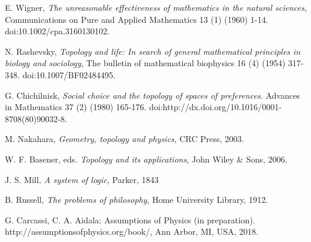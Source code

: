 \documentclass{amsart}
\theoremstyle{definition}
\numberwithin{equation}{section}
\begin{document}

\begin{thebibliography}{10}
	
	\smallskip
	
	 E. Wigner, {\it The unreasonable effectiveness of mathematics in the natural sciences}, Communications on Pure and Applied Mathematics 13 (1) (1960) 1-14. doi:10.1002/cpa.3160130102.
	
	\smallskip
	
	 N. Rashevsky, {\it Topology and life: In search of general mathematical principles in biology and sociology}, The bulletin of mathematical biophysics 16 (4) (1954) 317-348. doi:10.1007/BF02484495.
	
	\smallskip
	
	
	 G. Chichilnisk, {\it Social choice and the topology of spaces of preferences}. Advances in Mathematics 37 (2) (1980) 165-176. doi:http://dx.doi.org/10.1016/0001-8708(80)90032-8.
	
	\smallskip
	
	 M. Nakahara, {\it Geometry, topology and physics}, CRC Press, 2003.
	
	\smallskip
	
	 W. F. Basener, eds. {\it Topology and its applications}, John Wiley \& Sons, 2006.
	
	\smallskip
	
	  J. S. Mill, {\it A system of logic}, Parker, 1843
	
	\smallskip
	
	 B. Russell, {\it The problems of philosophy}, Home University Library, 1912.
	
	\smallskip

	 G. Carcassi, C. A. Aidala: Assumptions of Physics (in preparation). http://assumptionsofphysics.org/book/, Ann Arbor, MI, USA, 2018.
\end{thebibliography}
\end{document}
